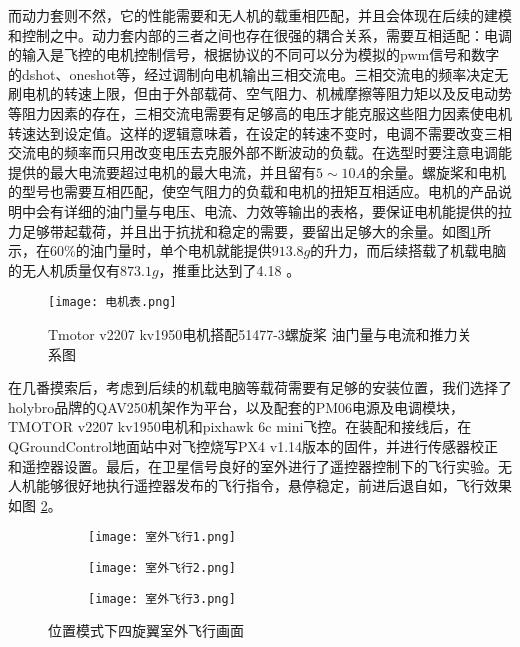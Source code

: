 而动力套则不然，它的性能需要和无人机的载重相匹配，并且会体现在后续的建模和控制之中。动力套内部的三者之间也存在很强的耦合关系，需要互相适配：电调的输入是飞控的电机控制信号，根据协议的不同可以分为模拟的pwm信号和数字的dshot、oneshot等，经过调制向电机输出三相交流电。三相交流电的频率决定无刷电机的转速上限，但由于外部载荷、空气阻力、机械摩擦等阻力矩以及反电动势等阻力因素的存在，三相交流电需要有足够高的电压才能克服这些阻力因素使电机转速达到设定值。这样的逻辑意味着，在设定的转速不变时，电调不需要改变三相交流电的频率而只用改变电压去克服外部不断波动的负载。在选型时要注意电调能提供的最大电流要超过电机的最大电流，并且留有$5\sim 10A$的余量。螺旋桨和电机的型号也需要互相匹配，使空气阻力的负载和电机的扭矩互相适应。电机的产品说明中会有详细的油门量与电压、电流、力效等输出的表格，要保证电机能提供的拉力足够带起载荷，并且出于抗扰和稳定的需要，要留出足够大的余量。如图\ref{电机表}所示，在$60 \%$的油门量时，单个电机就能提供$913.8g$的升力，而后续搭载了机载电脑的无人机质量仅有$873.1g$，推重比达到了4.18 。
\begin{figure}[!h]
  \centering
  \texttt{[image: 电机表.png]}
  \caption{Tmotor v2207 kv1950电机搭配51477-3螺旋桨 油门量与电流和推力关系图 \cite{Tmotor2023}}
  \label{电机表}
\end{figure}

在几番摸索后，考虑到后续的机载电脑等载荷需要有足够的安装位置，我们选择了holybro品牌的QAV250机架作为平台，以及配套的PM06电源及电调模块，TMOTOR v2207 kv1950电机和pixhawk 6c mini飞控。在装配和接线后，在QGroundControl地面站中对飞控烧写PX4 v1.14版本的固件，并进行传感器校正和遥控器设置。最后，在卫星信号良好的室外进行了遥控器控制下的飞行实验。无人机能够很好地执行遥控器发布的飞行指令，悬停稳定，前进后退自如，飞行效果如图 \ref{室外飞行}。

\begin{figure}[h]
  \centering
  \begin{subfigure}[c]{0.33\textwidth}
    \centering
    \texttt{[image: 室外飞行1.png]}
  \end{subfigure} \hfill
  \begin{subfigure}[c]{0.33\textwidth}
    \centering
    \texttt{[image: 室外飞行2.png]}
  \end{subfigure}\hfill
    \begin{subfigure}[c]{0.33\textwidth}
      \centering
      \texttt{[image: 室外飞行3.png]}
  \end{subfigure}
  \caption{位置模式下四旋翼室外飞行画面}
  \label{室外飞行}
  \end{figure}

